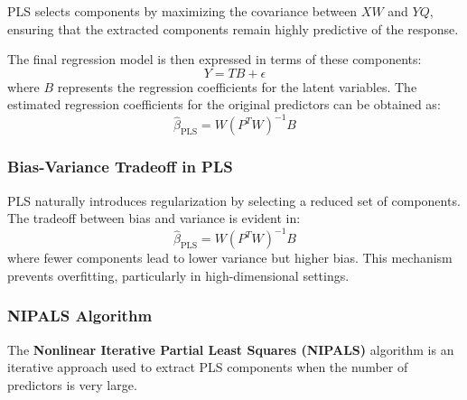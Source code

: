 \documentclass[11pt,twoside,a4paper]{article}
\begin{document}
PLS selects components by maximizing the covariance between \( XW \) and \( YQ \), ensuring that the extracted components remain highly predictive of the response.

The final regression model is then expressed in terms of these components:
\begin{equation}
Y = T B + \epsilon
\end{equation}
where \( B \) represents the regression coefficients for the latent variables. The estimated regression coefficients for the original predictors can be obtained as:
\begin{equation}
\hat{\beta}_{\text{PLS}} = W (P^T W)^{-1} B
\end{equation}

\subsubsection{Bias-Variance Tradeoff in PLS}
PLS naturally introduces regularization by selecting a reduced set of components. The tradeoff between bias and variance is evident in:
\begin{equation}
\hat{\beta}_{\text{PLS}} = W (P^T W)^{-1} B
\end{equation}
where fewer components lead to lower variance but higher bias. This mechanism prevents overfitting, particularly in high-dimensional settings.

\subsubsection{NIPALS Algorithm}
The \textbf{Nonlinear Iterative Partial Least Squares (NIPALS)} algorithm is an iterative approach used to extract PLS components when the number of predictors is very large.
\end{document}
